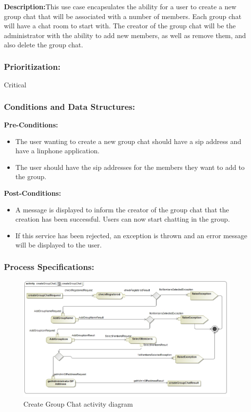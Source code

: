 \documentclass[a4paper]{article}
\begin{document}
\textbf{Description:}This use case encapsulates the ability for a user to create a new group chat that will be associated with a number of members. 
Each group chat will have a chat room to start with. The creator of the group chat will be the administrator with the ability to add new  members, as well as remove them, and also delete the group chat.

\subsubsection{Prioritization:}Critical
\subsubsection{Conditions and Data Structures:}
\textbf{Pre-Conditions:}
\begin{itemize}
	\item The user wanting to create a new group chat should have a sip address and have a linphone application. 
	\item The user should have the sip addresses for the members they want to add to the group.
\end{itemize}
\textbf{Post-Conditions:}
\begin{itemize}
	\item A message is displayed to inform the creator of the group chat that the creation has been successful. Users can now start chatting in the group.
	\item If this service has been rejected, an exception is thrown and an error message will be displayed to the user.
\end{itemize}
	
\subsubsection{Process Specifications:} 
\begin{figure}[H]
\includegraphics[width=1\linewidth]{./pictures/create_GroupChat.jpg}
\caption{Create Group Chat activity diagram }
\end{figure}
\end{document}
